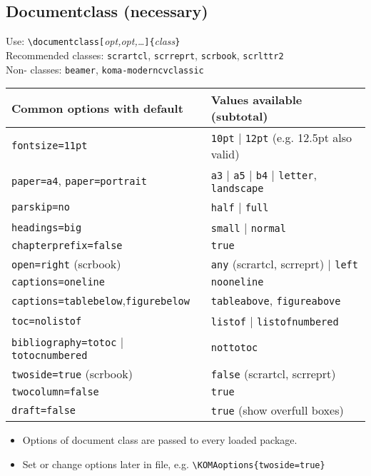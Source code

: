 \documentclass[fontsize=6pt,paper=a4,paper=landscape,twoside=false,parskip=half,
headings=small,numbers=withenddot,usegeometry=true,english]{scrartcl}
\begin{document}
\begin{multicols}{4}
{\subsection{Documentclass (necessary)}\label{sec:options}
Use: \lstinline+\documentclass[+\textit{opt,opt,\dots}\lstinline+]{+\textit{class}\lstinline+}+\\
Recommended classes: \lstinline+scrartcl+, \lstinline+scrreprt+, \lstinline+scrbook+, \lstinline+scrlttr2+\\ Non-\KOMAScript{} classes: \lstinline+beamer+, \lstinline+koma-moderncvclassic+\\[2pt]
\begin{tabular}{@{}ll@{}} \toprule
Common options with default  & Values available (subtotal) \\   \midrule
\lstinline+fontsize=11pt+     & \lstinline+10pt+ | \lstinline+12pt+ (e.g. 12.5pt also valid)\\
\lstinline+paper=a4+, \lstinline+paper=portrait+  & \lstinline+a3+ | \lstinline+a5+ | \lstinline+b4+ | \lstinline+letter+, \lstinline+landscape+ \\
\lstinline+parskip=no+        & \lstinline+half+ | \lstinline+full+\\
\lstinline+headings=big+      & \lstinline+small+ | \lstinline+normal+\\
\lstinline+chapterprefix=false+ & \lstinline+true+\\		
\lstinline+open=right+ (scrbook)& \lstinline+any+ (scrartcl, scrreprt) | \lstinline+left+\\ 
\lstinline+captions=oneline+    & \lstinline+nooneline+\\ 
\lstinline+captions=tablebelow+,\lstinline+figurebelow+ & \lstinline+tableabove+, \lstinline+figureabove+\\ 
\lstinline+toc=nolistof+      & \lstinline+listof+ | \lstinline+listofnumbered+\\
\lstinline+bibliography=totoc+ | \lstinline+totocnumbered+ & \lstinline+nottotoc+ \\
\lstinline+twoside=true+ (scrbook)  & \lstinline+false+ (scrartcl, scrreprt)\\
\lstinline+twocolumn=false+   & \lstinline+true+  \\
\lstinline+draft=false+       & \lstinline+true+ (show overfull boxes)\\   \bottomrule
\end{tabular}
\begin{itemize}
\item
Options of document class are passed to every loaded package.
\item
Set or change options later in file, e.g. \lstinline+\KOMAoptions{twoside=true}+
\end{itemize}
}


\end{multicols}
\end{document}
